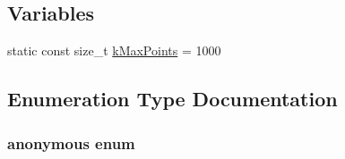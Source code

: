 \subsection*{Variables}
\begin{DoxyCompactItemize}
\item 
static const size\-\_\-t \hyperlink{a00244_a911abfdb9f51dcabfca0c839c277de85}{k\-Max\-Points} = 1000
\end{DoxyCompactItemize}


\subsection{Enumeration Type Documentation}
\hypertarget{a00244_a385c44f6fb256e5716a2302a5b940388}{\subsubsection[{anonymous enum}]{\setlength{\rightskip}{0pt plus 5cm}anonymous enum}}\label{a00244_a385c44f6fb256e5716a2302a5b940388}

